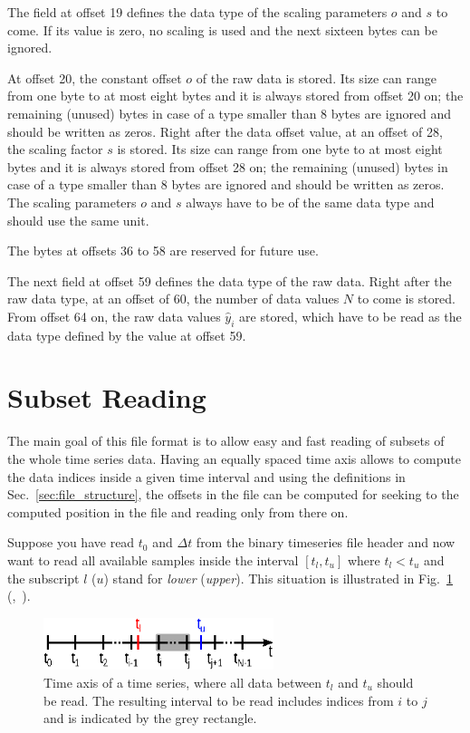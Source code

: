 \documentclass[a4paper,10pt]{article}
\begin{document}
The field at offset 19 defines the data type of the scaling parameters $o$ and $s$ to come.
If its value is zero, no scaling is used and the next sixteen bytes can be ignored.

At offset 20, the constant offset $o$ of the raw data is stored. Its size can range from one byte to at most eight bytes
and it is always stored from offset 20 on; the remaining (unused) bytes in case of a type smaller than 8 bytes are ignored and should be written as zeros.
Right after the data offset value, at an offset of 28, the scaling factor $s$ is stored.
Its size can range from one byte to at most eight bytes
and it is always stored from offset 28 on; the remaining (unused) bytes in case of a type smaller than 8 bytes are ignored and should be written as zeros.
The scaling parameters $o$ and $s$ always have to be of the same data type and should use the same unit.

The bytes at offsets 36 to 58 are reserved for future use.

The next field at offset 59 defines the data type of the raw data.
Right after the raw data type, at an offset of 60, the number of data values $N$ to come is stored.
From offset 64 on, the raw data values $\hat{y}_i$ are stored, which have to be read as the data type defined by the value at offset 59.

\section{Subset Reading}\label{sec:subset_reading}
The main goal of this file format is to allow easy and fast reading of subsets of the whole time series data.
Having an equally spaced time axis allows to compute the data indices inside a given time interval and using the definitions in Sec.~\ref{sec:file_structure},
the offsets in the file can be computed for seeking to the computed position in the file and reading only from there on.

Suppose you have read $t_0$ and $\Delta t$ from the binary timeseries file header and now want to read all available samples
inside the interval $[t_l, t_u]$ where $t_l < t_u$ and the subscript $l$ ($u$) stand for \textit{lower} (\textit{upper}).
This situation is illustrated in Fig.~\ref{fig:timeAxis}
(,~).
\begin{figure}[htbp]
  \centering
  \includegraphics[width=0.6\textwidth]{timeAxis.eps}
  \caption{Time axis of a time series, where all data between $t_l$ and $t_u$ should be read.
  The resulting interval to be read includes indices from $i$ to $j$ and is indicated by the grey rectangle.}
  \label{fig:timeAxis}
\end{figure}
\end{document}

